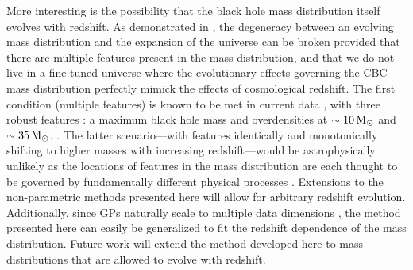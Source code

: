 \documentclass[preprint2,linenumbers]{aastex631}
\begin{document}
More interesting is the possibility that the black hole mass distribution itself evolves with redshift.
As demonstrated in \citet{ezquiaga_spectral_2022}, the degeneracy between an evolving mass distribution and the expansion of the universe can be broken provided that there are multiple features present in the mass distribution, and that we do not live in a fine-tuned universe where the evolutionary effects governing the \ac{CBC} mass distribution perfectly mimick the effects of cosmological redshift.
The first condition (multiple features) is known to be met in current data \citep{abbott_population_2023}, with three robust features \citep{farah_things_2023}: a maximum black hole mass and overdensities at $\sim10\,\text{M}_{\odot}$ and $\sim35\,\text{M}_{\odot}$.
.
The latter scenario---with features identically and monotonically shifting to higher masses with increasing redshift---would be astrophysically unlikely as the locations of features in the mass distribution are each thought to be governed by fundamentally different physical processes \citep{mapelli_binary_2020}.
Extensions to the non-parametric methods presented here will allow for arbitrary redshift evolution.
Additionally, since \aclp{GP} naturally scale to multiple data dimensions \citep{rasmussen_gaussian_2006}, the method presented here can easily be generalized to fit the redshift dependence of the mass distribution. 
Future work will extend the method developed here to mass distributions that are allowed to evolve with redshift.
\end{document}
